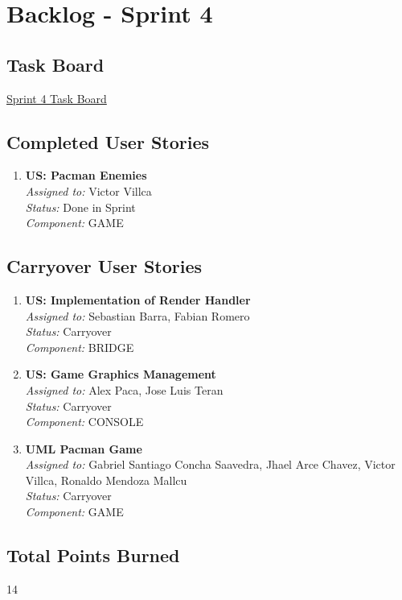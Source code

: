 \section*{Backlog - Sprint 4}
\subsection*{Task Board}
\href{https://tree.taiga.io/project/joseluis-teran-coffeetime/taskboard/sprint-4-6137}{Sprint 4 Task Board}

\subsection*{Completed User Stories}

\begin{enumerate}
    \item \textbf{US: Pacman Enemies} \\
    \textit{Assigned to:} Victor Villca \\
    \textit{Status:} Done in Sprint \\
    \textit{Component:} GAME
\end{enumerate}

\subsection*{Carryover User Stories}

\begin{enumerate}
    \item \textbf{US: Implementation of Render Handler} \\
    \textit{Assigned to:} Sebastian Barra, Fabian Romero \\
    \textit{Status:} Carryover \\
    \textit{Component:} BRIDGE
    \item \textbf{US: Game Graphics Management} \\
    \textit{Assigned to:} Alex Paca, Jose Luis Teran \\
    \textit{Status:} Carryover \\
    \textit{Component:} CONSOLE
    \item \textbf{UML Pacman Game} \\
    \textit{Assigned to:} Gabriel Santiago Concha Saavedra, Jhael Arce Chavez, Victor Villca, Ronaldo Mendoza Mallcu \\
    \textit{Status:} Carryover \\
    \textit{Component:} GAME
\end{enumerate}

\subsection*{Total Points Burned}
14